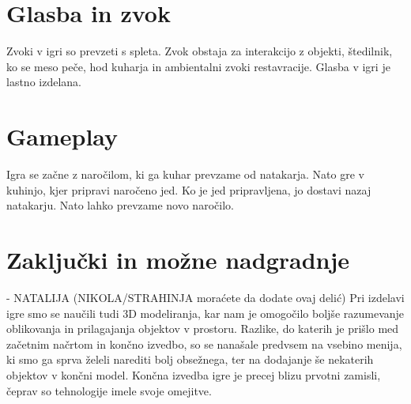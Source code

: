 \documentclass[a4paper]{article}
\begin{document}
\section{Glasba in zvok}
Zvoki v igri so prevzeti s spleta. Zvok obstaja za interakcijo z objekti, štedilnik, ko se meso peče, hod kuharja in ambientalni zvoki restavracije.
Glasba v igri je lastno izdelana.

\section{Gameplay}
Igra se začne z naročilom, ki ga kuhar prevzame od natakarja. Nato gre v kuhinjo, kjer pripravi naročeno jed. 
Ko je jed pripravljena, jo dostavi nazaj natakarju. Nato lahko prevzame novo naročilo. 

\section{Zaključki in možne nadgradnje} - NATALIJA
(NIKOLA/STRAHINJA moraćete da dodate ovaj delić) 
Pri izdelavi igre smo se naučili tudi 3D modeliranja, kar nam je omogočilo boljše razumevanje oblikovanja in prilagajanja objektov v prostoru.
Razlike, do katerih je prišlo med začetnim načrtom in končno izvedbo, so se nanašale predvsem na vsebino menija, ki smo ga sprva želeli narediti bolj obsežnega, ter na dodajanje še nekaterih objektov v končni model.
Končna izvedba igre je precej blizu prvotni zamisli, čeprav so tehnologije imele svoje omejitve.

\small


\end{document}
